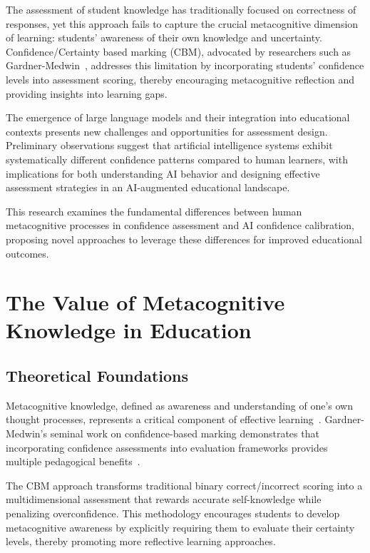 \documentclass[sigconf]{acmart}
\begin{document}
The assessment of student knowledge has traditionally focused on correctness of responses, yet this approach fails to capture the crucial metacognitive dimension of learning: students' awareness of their own knowledge and uncertainty. Confidence/Certainty based marking (CBM), advocated by researchers such as Gardner-Medwin~\cite{gardner2006confidence}, addresses this limitation by incorporating students' confidence levels into assessment scoring, thereby encouraging metacognitive reflection and providing insights into learning gaps.




The emergence of large language models and their integration into educational contexts presents new challenges and opportunities for assessment design. Preliminary observations suggest that artificial intelligence systems exhibit systematically different confidence patterns compared to human learners, with implications for both understanding AI behavior and designing effective assessment strategies in an AI-augmented educational landscape.

This research examines the fundamental differences between human metacognitive processes in confidence assessment and AI confidence calibration, proposing novel approaches to leverage these differences for improved educational outcomes.

\section{The Value of Metacognitive Knowledge in Education}

\subsection{Theoretical Foundations}

Metacognitive knowledge, defined as awareness and understanding of one's own thought processes, represents a critical component of effective learning~\cite{flavell1976metacognitive}. Gardner-Medwin's seminal work on confidence-based marking demonstrates that incorporating confidence assessments into evaluation frameworks provides multiple pedagogical benefits~\cite{gardner2006confidence, gardner2011learning}.

The CBM approach transforms traditional binary correct/incorrect scoring into a multidimensional assessment that rewards accurate self-knowledge while penalizing overconfidence. This methodology encourages students to develop metacognitive awareness by explicitly requiring them to evaluate their certainty levels, thereby promoting more reflective learning approaches.
\end{document}
